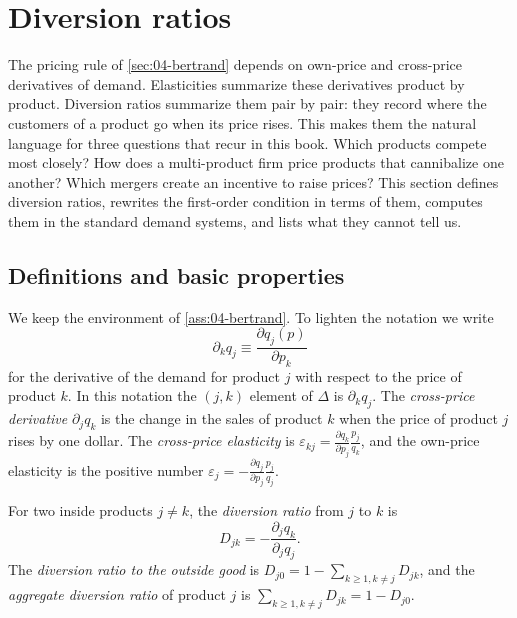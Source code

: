 \section{Diversion ratios}\label{sec:04-diversion}

The pricing rule of \cref{sec:04-bertrand} depends on own-price and cross-price derivatives of demand.
Elasticities summarize these derivatives product by product. Diversion ratios summarize them pair by pair:
they record where the customers of a product go when its price rises. This makes them the natural language
for three questions that recur in this book. Which products compete most closely? How does a multi-product
firm price products that cannibalize one another? Which mergers create an incentive to raise prices? This
section defines diversion ratios, rewrites the first-order condition in terms of them, computes them in the
standard demand systems, and lists what they cannot tell us.

\subsection{Definitions and basic properties}\label{sec:04-diversion-def}

We keep the environment of \cref{ass:04-bertrand}. To lighten the notation we write
\[
  \partial_k q_j \equiv \frac{\partial q_j(p)}{\partial p_k}
\]
for the derivative of the demand for product $j$ with respect to the price of product $k$. In this notation
the $(j,k)$ element of $\Delta$ is $\partial_k q_j$. The \emph{cross-price derivative} $\partial_j q_k$ is the
change in the sales of product $k$ when the price of product $j$ rises by one dollar. The \emph{cross-price
elasticity} is $\varepsilon_{kj} = \frac{\partial q_k}{\partial p_j}\frac{p_j}{q_k}$, and the own-price
elasticity is the positive number $\varepsilon_j = -\frac{\partial q_j}{\partial p_j}\frac{p_j}{q_j}$.

\begin{definition}\label{def:04-diversion}
For two inside products $j \neq k$, the \emph{diversion ratio} from $j$ to $k$ is
\begin{equation}\label{eq:04-diversion-def}
  D_{jk} = -\frac{\partial_j q_k}{\partial_j q_j}.
\end{equation}
The \emph{diversion ratio to the outside good} is $D_{j0} = 1 - \sum_{k \ge 1, k \neq j} D_{jk}$, and the
\emph{aggregate diversion ratio} of product $j$ is $\sum_{k \ge 1, k \neq j} D_{jk} = 1 - D_{j0}$.
\end{definition}

